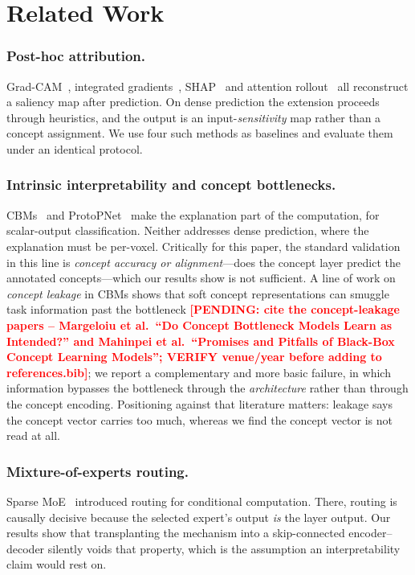 \documentclass[runningheads]{llncs}
\newcounter{pend}
\newcommand{\pending}[1]{\stepcounter{pend}\textcolor{red}{\textbf{[PENDING: #1]}}}
\begin{document}
\section{Related Work}
\subsubsection{Post-hoc attribution.}
Grad-CAM~\cite{selvaraju2017gradcam}, integrated gradients~\cite{sundararajan2017ig},
SHAP~\cite{lundberg2017shap} and attention rollout~\cite{abnar2020rollout} all reconstruct a
saliency map after prediction. On dense prediction the extension proceeds through heuristics,
and the output is an input-\emph{sensitivity} map rather than a concept assignment. We use four
such methods as baselines and evaluate them under an identical protocol.

\subsubsection{Intrinsic interpretability and concept bottlenecks.}
CBMs~\cite{koh2020cbm} and ProtoPNet~\cite{chen2019protopnet} make the explanation part of the
computation, for scalar-output classification. Neither addresses dense prediction, where the
explanation must be per-voxel. Critically for this paper, the standard validation in this line
is \emph{concept accuracy or alignment}---does the concept layer predict the annotated
concepts---which our results show is not sufficient. A line of work on \emph{concept leakage}
in CBMs shows that soft concept representations can smuggle task information past the
bottleneck \pending{cite the concept-leakage papers -- Margeloiu et al.\ ``Do Concept
Bottleneck Models Learn as Intended?'' and Mahinpei et al.\ ``Promises and Pitfalls of
Black-Box Concept Learning Models''; VERIFY venue/year before adding to references.bib};
we report a complementary and more basic failure, in which information bypasses the bottleneck
through the \emph{architecture} rather than through the concept encoding. Positioning against
that literature matters: leakage says the concept vector carries too much, whereas we find the
concept vector is not read at all.

\subsubsection{Mixture-of-experts routing.}
Sparse MoE~\cite{shazeer2017moe,fedus2022switch,riquelme2021vmoe} introduced routing for
conditional computation. There, routing is causally decisive because the selected expert's
output \emph{is} the layer output. Our results show that transplanting the mechanism into a
skip-connected encoder--decoder silently voids that property, which is the assumption an
interpretability claim would rest on.
\end{document}
